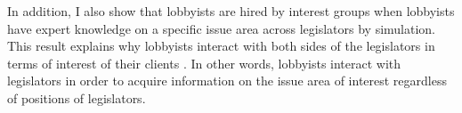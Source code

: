 \documentclass{article}
\begin{document}
In addition, 
I also show that 
lobbyists are hired by interest groups 
when lobbyists have
expert knowledge on a specific issue area across 
legislators by simulation.
This result explains 
why lobbyists interact 
with both sides of the legislators
in terms of interest of their clients
\citep{10.2307/2586303}.
In other words, 
lobbyists interact with 
legislators
in order to acquire information
on the issue area of interest
regardless of positions of legislators.











\end{document}

